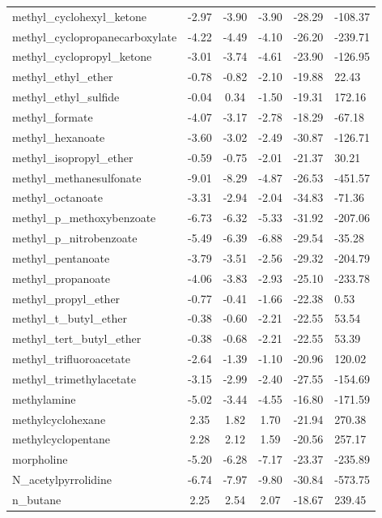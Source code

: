 \documentclass{amsart}
\begin{document}
\begin{longtable}{L|C|C|C|X|X}
methyl\_cyclohexyl\_ketone & -2.97 & -3.90 & -3.90 & -28.29 & -108.37 \\ 
methyl\_cyclopropanecarboxylate & -4.22 & -4.49 & -4.10 & -26.20 & -239.71 \\ 
methyl\_cyclopropyl\_ketone & -3.01 & -3.74 & -4.61 & -23.90 & -126.95 \\ 
methyl\_ethyl\_ether & -0.78 & -0.82 & -2.10 & -19.88 & 22.43 \\ 
methyl\_ethyl\_sulfide & -0.04 & 0.34 & -1.50 & -19.31 & 172.16 \\ 
methyl\_formate & -4.07 & -3.17 & -2.78 & -18.29 & -67.18 \\ 
methyl\_hexanoate & -3.60 & -3.02 & -2.49 & -30.87 & -126.71 \\ 
methyl\_isopropyl\_ether & -0.59 & -0.75 & -2.01 & -21.37 & 30.21 \\ 
methyl\_methanesulfonate & -9.01 & -8.29 & -4.87 & -26.53 & -451.57 \\ 
methyl\_octanoate & -3.31 & -2.94 & -2.04 & -34.83 & -71.36 \\ 
methyl\_p\_methoxybenzoate & -6.73 & -6.32 & -5.33 & -31.92 & -207.06 \\ 
methyl\_p\_nitrobenzoate & -5.49 & -6.39 & -6.88 & -29.54 & -35.28 \\ 
methyl\_pentanoate & -3.79 & -3.51 & -2.56 & -29.32 & -204.79 \\ 
methyl\_propanoate & -4.06 & -3.83 & -2.93 & -25.10 & -233.78 \\ 
methyl\_propyl\_ether & -0.77 & -0.41 & -1.66 & -22.38 & 0.53 \\ 
methyl\_t\_butyl\_ether & -0.38 & -0.60 & -2.21 & -22.55 & 53.54 \\ 
methyl\_tert\_butyl\_ether & -0.38 & -0.68 & -2.21 & -22.55 & 53.39 \\ 
methyl\_trifluoroacetate & -2.64 & -1.39 & -1.10 & -20.96 & 120.02 \\ 
methyl\_trimethylacetate & -3.15 & -2.99 & -2.40 & -27.55 & -154.69 \\ 
methylamine & -5.02 & -3.44 & -4.55 & -16.80 & -171.59 \\ 
methylcyclohexane & 2.35 & 1.82 & 1.70 & -21.94 & 270.38 \\ 
methylcyclopentane & 2.28 & 2.12 & 1.59 & -20.56 & 257.17 \\ 
morpholine & -5.20 & -6.28 & -7.17 & -23.37 & -235.89 \\ 
N\_acetylpyrrolidine & -6.74 & -7.97 & -9.80 & -30.84 & -573.75 \\ 
n\_butane & 2.25 & 2.54 & 2.07 & -18.67 & 239.45 \\ 

\end{longtable}
\end{document}
